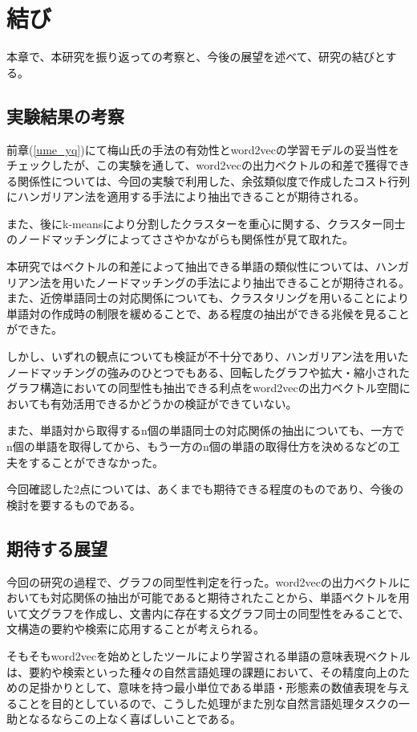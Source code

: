 \chapter{結び}
本章で、本研究を振り返っての考察と、今後の展望を述べて、研究の結びとする。

\section{実験結果の考察}
前章(\ref{ume_yq})にて梅山氏の手法の有効性とword2vecの学習モデルの妥当性をチェックしたが、この実験を通して、word2vecの出力ベクトルの和差で獲得できる関係性については、今回の実験で利用した、余弦類似度で作成したコスト行列にハンガリアン法を適用する手法により抽出できることが期待される。

また、後にk-meansにより分割したクラスターを重心に関する、クラスター同士のノードマッチングによってささやかながらも関係性が見て取れた。

本研究ではベクトルの和差によって抽出できる単語の類似性については、ハンガリアン法を用いたノードマッチングの手法により抽出できることが期待される。また、近傍単語同士の対応関係についても、クラスタリングを用いることにより単語対の作成時の制限を緩めることで、ある程度の抽出ができる兆候を見ることができた。

しかし、いずれの観点についても検証が不十分であり、ハンガリアン法を用いたノードマッチングの強みのひとつでもある、回転したグラフや拡大・縮小されたグラフ構造においての同型性も抽出できる利点をword2vecの出力ベクトル空間においても有効活用できるかどうかの検証ができていない。

また、単語対から取得するn個の単語同士の対応関係の抽出についても、一方でn個の単語を取得してから、もう一方のn個の単語の取得仕方を決めるなどの工夫をすることができなかった。

今回確認した2点については、あくまでも期待できる程度のものであり、今後の検討を要するものである。

\section{期待する展望}
今回の研究の過程で、グラフの同型性判定を行った。word2vecの出力ベクトルにおいても対応関係の抽出が可能であると期待されたことから、単語ベクトルを用いて文グラフを作成し、文書内に存在する文グラフ同士の同型性をみることで、文構造の要約や検索に応用することが考えられる。

そもそもword2vecを始めとしたツールにより学習される単語の意味表現ベクトルは、要約や検索といった種々の自然言語処理の課題において、その精度向上のための足掛かりとして、意味を持つ最小単位である単語・形態素の数値表現を与えることを目的としているので、こうした処理がまた別な自然言語処理タスクの一助となるならこの上なく喜ばしいことである。
